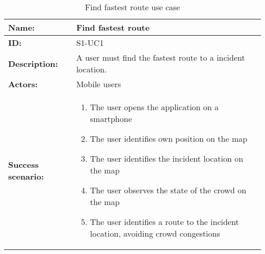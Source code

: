 \begin{table}[h!]
    \centering
    \begin{tabularx}{\textwidth}{|l|X|}
        \hline
        \textbf{Name:}  & Find fastest route \\ \hline
        \textbf{ID:}    & S1-UC1 \\ \hline
        \textbf{Description:} & A user must find the fastest route to a incident location. \\ \hline
        \textbf{Actors:} & Mobile users \\ \hline
        \textbf{Success scenario:} & 
        \begin{enumerate}
            \item The user opens the application on a smartphone
            \item The user identifies own position on the map
            \item The user identifies the incident location on the map
            \item The user observes the state of the crowd on the map
            \item The user identifies a route to the incident location, avoiding crowd congestions
        \end{enumerate}
        \\
        \hline
    \end{tabularx}
    \caption{Find fastest route use case}
    \label{tab:s1-uc1}
\end{table}

